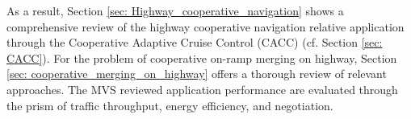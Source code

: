     As a result, Section \ref{sec: Highway_cooperative_navigation} shows a comprehensive review of the highway cooperative navigation relative application through the Cooperative Adaptive Cruise Control (CACC) (cf. Section \ref{sec: CACC}).  For the problem of cooperative on-ramp merging on highway, Section \ref{sec: cooperative_merging_on_highway} offers a thorough review of relevant approaches. The MVS reviewed application performance are evaluated through the prism of traffic throughput, energy efficiency, and negotiation. 
    
